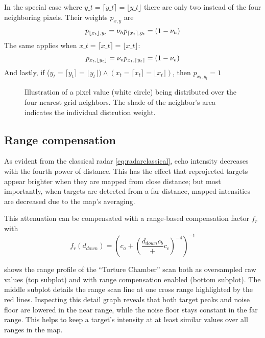 In the special case where $y\_t = \lceil y\_t \rceil = \lfloor y\_t\rfloor$ there are only two instead of the four neighboring pixels. Their weights \(p_{x,y}\) are \[
p_{\lfloor x_t \rfloor, y_t} = \nu_h\\
p_{\lceil x_t \rceil, y_t} = (1 - \nu_h)
\] The same applies when $x\_t = \lceil x\_t \rceil = \lfloor x\_t\rfloor$: \[
p_{x_t, \lfloor y_t \rfloor} = \nu_v\\
p_{x_t, \lceil y_t \rceil} = (1 - \nu_v)
\] And lastly, if
(\(y_t = \lceil y_t \rceil = \lfloor y_t \rfloor ) \land (x_t = \lceil x_t \rceil = \lfloor x_t \rfloor )\),
then \(p_{x_t, y_t} = 1\)

\begin{figure}[htbp]
    \centering
    \def\svgwidth{10cm}
    
    \caption{Illustration of a pixel value (white circle) being distributed over the four nearest grid neighbors. The shade of the neighbor's area indicates the individual distrution weight.}
    \label{fig:Sample_splitting}
\end{figure}

\subsection{Range compensation}\label{range-compensation}

As evident from the classical radar \cref{eq:radarclassical}, echo intensity decreases with
the fourth power of distance. This has the effect that reprojected
targets appear brighter when they are mapped from close distance; but
most importantly, when targets are detected from a far distance, mapped
intensities are decreased due to the map's averaging.

This attenuation can be compensated with a range-based compensation
factor \(f_r\) with \[f_r(d_{down}) = {
\left(
c_a + (
\frac{{d_{down}}{c_b}}
+ c_c)^{-4}
\right) ^ {-1}
}\]


 shows the range profile of the ``Torture Chamber'' scan
both as oversampled raw values (top subplot) and with range compensation
enabled (bottom subplot). The middle subplot details the range scan line
at one cross range highlighted by the red lines. Inspecting this detail
graph reveals that both target peaks and noise floor are lowered in the
near range, while the noise floor stays constant in the far range. This
helps to keep a target's intensity at at least similar values over all
ranges in the map.

